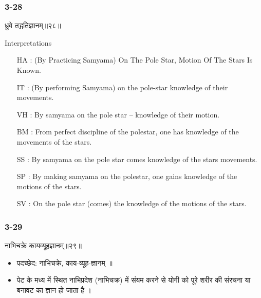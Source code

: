 \begin{frame}[fragile]\frametitle{3-28}
\begin{sanskrit}
ध्रुवे तद्गतिज्ञानम्॥२८॥
\end{sanskrit}

Interpretations
\begin{itemize}	
\item [HA]: (By Practicing Samyama) On The Pole Star, Motion Of The Stars Is Known.
\item [IT]: (By performing Samyama) on the pole-star knowledge of their movements.
\item [VH]: By samyama on the pole star – knowledge of their motion.
\item [BM]: From perfect discipline of the polestar, one has knowledge of the movements of the stars.
\item [SS]: By samyama on the pole star comes knowledge of the stars movements.
\item [SP]: By making samyama on the polestar, one gains knowledge of the motions of the stars.
\item [SV]: On the pole star (comes) the knowledge of the motions of the stars. 
\end{itemize}
\end{frame}

\begin{frame}[fragile]\frametitle{3-29}
\begin{sanskrit}
नाभिचक्रे कायव्यूहज्ञानम्॥२९॥
\end{sanskrit}

\begin{itemize}
\item पदच्छेद:  नाभिचक्रे, काय-व्यूह-ज्ञानम् ॥
\item पेट के मध्य में स्थित नाभिप्रदेश (नाभिचक्र) में संयम करने से योगी को पूरे शरीर की संरचना या बनावट का ज्ञान हो जाता है ।
\end{itemize}
\end{frame}

